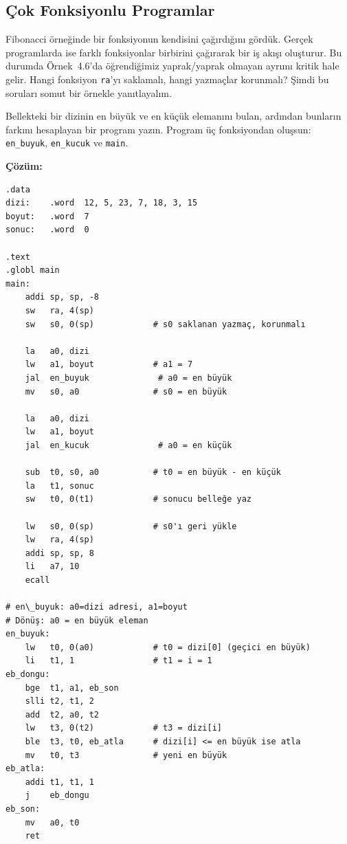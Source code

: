\subsection{Çok Fonksiyonlu Programlar}
\label{subsec:cok-fonksiyonlu}

Fibonacci örneğinde bir fonksiyonun kendisini çağırdığını gördük. Gerçek programlarda ise farklı fonksiyonlar birbirini çağırarak bir iş akışı oluşturur. Bu durumda Örnek~4.6'da öğrendiğimiz yaprak/yaprak olmayan ayrımı kritik hale gelir. Hangi fonksiyon \texttt{ra}'yı saklamalı, hangi yazmaçlar korunmalı? Şimdi bu soruları somut bir örnekle yanıtlayalım.

\begin{ornek}[4.15]
\label{orn:cok-fonksiyon}
Bellekteki bir dizinin en büyük ve en küçük elemanını bulan, ardından bunların farkını hesaplayan bir program yazın. Program üç fonksiyondan oluşsun: \texttt{en\_buyuk}, \texttt{en\_kucuk} ve \texttt{main}.

\textbf{Çözüm:}

\begin{lstlisting}[style=riscv]
.data
dizi:    .word  12, 5, 23, 7, 18, 3, 15
boyut:   .word  7
sonuc:   .word  0

.text
.globl main
main:
    addi sp, sp, -8
    sw   ra, 4(sp)
    sw   s0, 0(sp)            # s0 saklanan yazmaç, korunmalı

    la   a0, dizi
    lw   a1, boyut            # a1 = 7
    jal  en_buyuk              # a0 = en büyük
    mv   s0, a0               # s0 = en büyük

    la   a0, dizi
    lw   a1, boyut
    jal  en_kucuk              # a0 = en küçük

    sub  t0, s0, a0           # t0 = en büyük - en küçük
    la   t1, sonuc
    sw   t0, 0(t1)            # sonucu belleğe yaz

    lw   s0, 0(sp)            # s0'ı geri yükle
    lw   ra, 4(sp)
    addi sp, sp, 8
    li   a7, 10
    ecall

# en\_buyuk: a0=dizi adresi, a1=boyut
# Dönüş: a0 = en büyük eleman
en_buyuk:
    lw   t0, 0(a0)            # t0 = dizi[0] (geçici en büyük)
    li   t1, 1                # t1 = i = 1
eb_dongu:
    bge  t1, a1, eb_son
    slli t2, t1, 2
    add  t2, a0, t2
    lw   t3, 0(t2)            # t3 = dizi[i]
    ble  t3, t0, eb_atla      # dizi[i] <= en büyük ise atla
    mv   t0, t3               # yeni en büyük
eb_atla:
    addi t1, t1, 1
    j    eb_dongu
eb_son:
    mv   a0, t0
    ret


\end{lstlisting}
\end{ornek}
